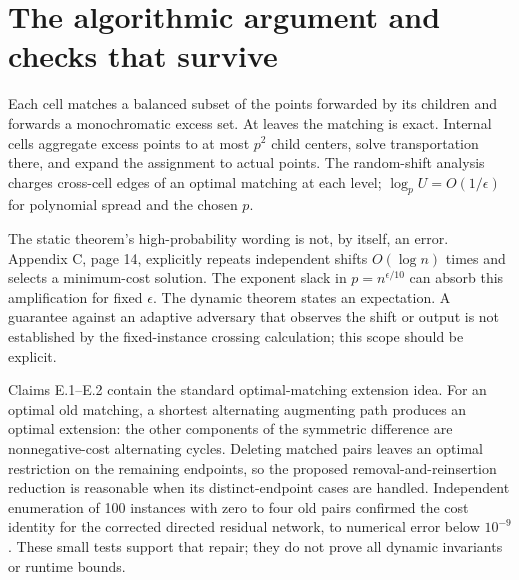 \documentclass[10pt]{article}
\begin{document}
\section*{The algorithmic argument and checks that survive}
Each cell matches a balanced subset of the points forwarded by its children and forwards a monochromatic excess set. At leaves the matching is exact. Internal cells aggregate excess points to at most \(p^2\) child centers, solve transportation there, and expand the assignment to actual points. The random-shift analysis charges cross-cell edges of an optimal matching at each level; \(\log_p U=O(1/\epsilon)\) for polynomial spread and the chosen \(p\).\par
The static theorem’s high-probability wording is not, by itself, an error. Appendix C, page 14, explicitly repeats independent shifts \(O(\log n)\) times and selects a minimum-cost solution. The exponent slack in \(p=n^{\epsilon/10}\) can absorb this amplification for fixed \(\epsilon\). The dynamic theorem states an expectation. A guarantee against an adaptive adversary that observes the shift or output is not established by the fixed-instance crossing calculation; this scope should be explicit.\par
Claims E.1–E.2 contain the standard optimal-matching extension idea. For an optimal old matching, a shortest alternating augmenting path produces an optimal extension: the other components of the symmetric difference are nonnegative-cost alternating cycles. Deleting matched pairs leaves an optimal restriction on the remaining endpoints, so the proposed removal-and-reinsertion reduction is reasonable when its distinct-endpoint cases are handled. Independent enumeration of 100 instances with zero to four old pairs confirmed the cost identity for the corrected directed residual network, to numerical error below \(10^{-9}\). These small tests support that repair; they do not prove all dynamic invariants or runtime bounds.\par
\end{document}
